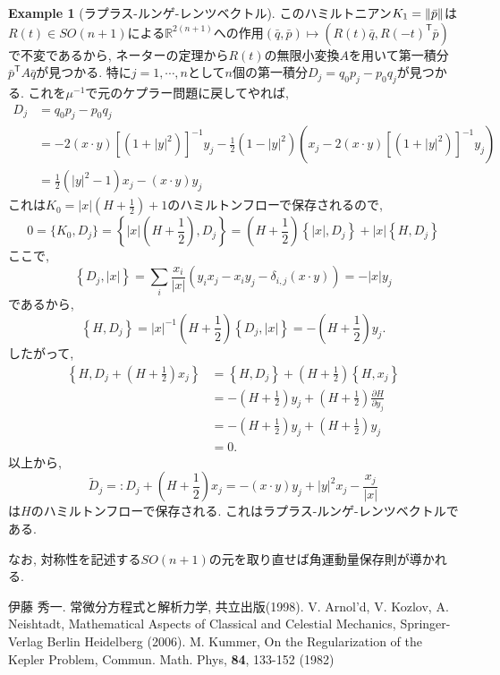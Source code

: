 \documentclass[a4paper]{ujarticle}
\numberwithin{equation}{section}
\theoremstyle{definition}
\newtheorem{example}{Example}
\begin{document}
\begin{example}[ラプラス-ルンゲ-レンツベクトル]
            このハミルトニアン$K_1 = \norm{\bar{p}}$は$R(t) \in SO(n+1)$による$\mathbb{R}^{2(n+1)}$への作用$(\bar{q}, \bar{p}) \mapsto (R(t) \bar{q}, R(-t)^{\mathsf{T}}\bar{p})$で不変であるから,
            ネーターの定理から$R(t)$の無限小変換$A$を用いて第一積分$\bar{p}^{\mathsf{T}} A \bar{q}$が見つかる.
            特に$j = 1, \cdots, n$として$n$個の第一積分$D_j = q_0 p_j - p_0 q_j$が見つかる.
            これを$\mu^{-1}$で元のケプラー問題に戻してやれば,
            \begin{align}
                D_j &= q_0 p_j - p_0 q_j \\
                &= - 2 (x \cdot y)[(1 + |y|^2)]^{-1}y_j - \frac{1}{2}(1 - |y|^2)(x_j - 2 (x \cdot y) [(1 + |y|^2)]^{-1} y_j)\\
                &= \frac{1}{2}(|y|^2 - 1) x_j - (x \cdot y) y_j
            \end{align}
            これは$K_0 = |x|\left(H + \frac{1}{2}\right) + 1$のハミルトンフローで保存されるので,
            \[
                0 = \{K_0, D_j\} = \left\{|x|\left(H + \frac{1}{2}\right), D_j\right\} = \left(H + \frac{1}{2}\right) \left\{|x|, D_j\right\} + |x| \left\{H , D_j\right\}
            \]
            ここで, 
            \[
                \left\{D_j, |x|\right\} = \sum_{i} \frac{x_i}{|x|} (y_i x_j - x_i y_j - \delta_{i, j}(x \cdot y)) =  - |x| y_j 
            \]
            であるから, 
            \[
                \left\{H , D_j\right\} = |x|^{-1} \left(H + \frac{1}{2}\right) \left\{D_j, |x|\right\} = - \left(H + \frac{1}{2}\right) y_j.
            \]
            したがって, 
            \begin{align}
                \left\{H , D_j + \left(H + \frac{1}{2}\right) x_j\right\} 
                &= \left\{H , D_j\right\} + \left(H + \frac{1}{2}\right) \left\{H , x_j\right\} \\
                &= - \left(H + \frac{1}{2}\right) y_j + \left(H + \frac{1}{2}\right) \frac{\partial H}{\partial y_j} \\
                &=  - \left(H + \frac{1}{2}\right) y_j + \left(H + \frac{1}{2}\right) y_j \\
                &= 0.
            \end{align}
            以上から, 
            \[
                \tilde{D}_j =: D_j + \left(H + \frac{1}{2}\right) x_j =  - (x \cdot y) y_j + |y|^2 x_j - \frac{x_j}{|x|}
            \]
            は$H$のハミルトンフローで保存される. これはラプラス-ルンゲ-レンツベクトルである.

            なお, 対称性を記述する$SO(n+1)$の元を取り直せば角運動量保存則が導かれる.
        \end{example}
    \begin{thebibliography}{10}
    \nocite{*}
	 伊藤 秀一. 常微分方程式と解析力学, 共立出版(1998).
     V. Arnol'd, V. Kozlov, A. Neishtadt, Mathematical Aspects of Classical and Celestial Mechanics, Springer-Verlag Berlin Heidelberg (2006).
     M. Kummer, On the Regularization of the Kepler Problem, Commun. Math. Phys, \textbf{84}, 133-152 (1982)
\end{thebibliography}
\end{document}
